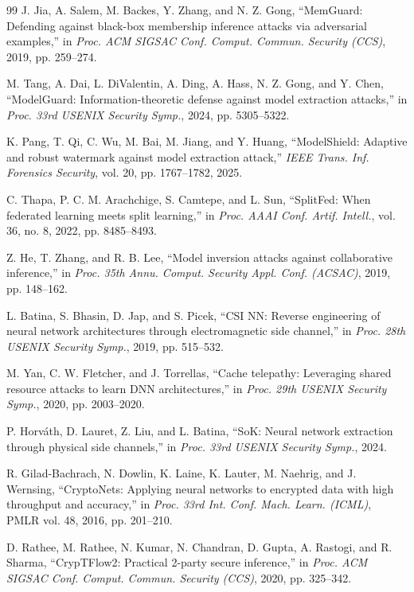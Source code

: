 \documentclass[lettersize,journal]{IEEEtran}
\begin{document}
\begin{thebibliography}{99}
J. Jia, A. Salem, M. Backes, Y. Zhang, and N. Z. Gong, ``MemGuard: Defending against black-box membership inference attacks via adversarial examples,'' in \emph{Proc. ACM SIGSAC Conf. Comput. Commun. Security (CCS)}, 2019, pp. 259--274.

M. Tang, A. Dai, L. DiValentin, A. Ding, A. Hass, N. Z. Gong, and Y. Chen, ``ModelGuard: Information-theoretic defense against model extraction attacks,'' in \emph{Proc. 33rd USENIX Security Symp.}, 2024, pp. 5305--5322.

K. Pang, T. Qi, C. Wu, M. Bai, M. Jiang, and Y. Huang, ``ModelShield: Adaptive and robust watermark against model extraction attack,'' \emph{IEEE Trans. Inf. Forensics Security}, vol. 20, pp. 1767--1782, 2025.

C. Thapa, P. C. M. Arachchige, S. Camtepe, and L. Sun, ``SplitFed: When federated learning meets split learning,'' in \emph{Proc. AAAI Conf. Artif. Intell.}, vol. 36, no. 8, 2022, pp. 8485--8493.

Z. He, T. Zhang, and R. B. Lee, ``Model inversion attacks against collaborative inference,'' in \emph{Proc. 35th Annu. Comput. Security Appl. Conf. (ACSAC)}, 2019, pp. 148--162.

L. Batina, S. Bhasin, D. Jap, and S. Picek, ``CSI NN: Reverse engineering of neural network architectures through electromagnetic side channel,'' in \emph{Proc. 28th USENIX Security Symp.}, 2019, pp. 515--532.

M. Yan, C. W. Fletcher, and J. Torrellas, ``Cache telepathy: Leveraging shared resource attacks to learn DNN architectures,'' in \emph{Proc. 29th USENIX Security Symp.}, 2020, pp. 2003--2020.

P. Horv\'{a}th, D. Lauret, Z. Liu, and L. Batina, ``SoK: Neural network extraction through physical side channels,'' in \emph{Proc. 33rd USENIX Security Symp.}, 2024.

R. Gilad-Bachrach, N. Dowlin, K. Laine, K. Lauter, M. Naehrig, and J. Wernsing, ``CryptoNets: Applying neural networks to encrypted data with high throughput and accuracy,'' in \emph{Proc. 33rd Int. Conf. Mach. Learn. (ICML)}, PMLR vol. 48, 2016, pp. 201--210.

D. Rathee, M. Rathee, N. Kumar, N. Chandran, D. Gupta, A. Rastogi, and R. Sharma, ``CrypTFlow2: Practical 2-party secure inference,'' in \emph{Proc. ACM SIGSAC Conf. Comput. Commun. Security (CCS)}, 2020, pp. 325--342.


\end{thebibliography}
\end{document}
